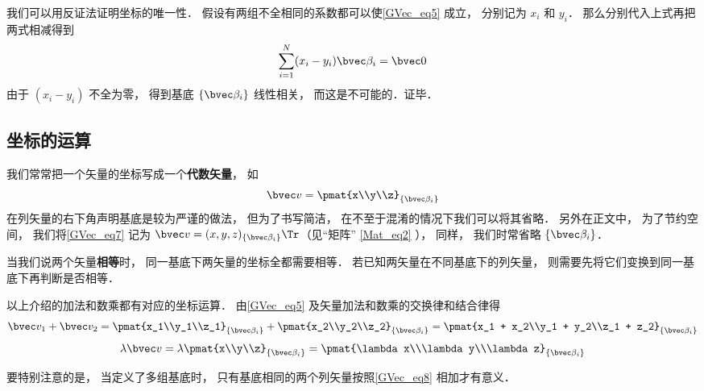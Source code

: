 我们可以用反证法证明坐标的唯一性． 假设有两组不全相同的系数都可以使\autoref{GVec_eq5} 成立， 分别记为 $x_i$ 和 $y_i$． 那么分别代入上式再把两式相减得到
\begin{equation}
\sum_{i=1}^N (x_i-y_i) \bvec \beta_i = \bvec 0
\end{equation}
由于 $(x_i-y_i)$ 不全为零， 得到基底 $\{\bvec \beta_i\}$ 线性相关， 而这是不可能的．证毕．

\subsection{坐标的运算}
我们常常把一个矢量的坐标写成一个\textbf{代数矢量}， 如
\begin{equation}\label{GVec_eq7}
\bvec v = \pmat{x\\y\\z}_{\{\bvec\beta_i\}}
\end{equation}
在列矢量的右下角声明基底是较为严谨的做法， 但为了书写简洁， 在不至于混淆的情况下我们可以将其省略． 另外在正文中， 为了节约空间， 我们将\autoref{GVec_eq7} 记为 $\bvec v = (x, y, z)_{\{\bvec\beta_i\}}\Tr$（见“矩阵” \autoref{Mat_eq2} ）， 同样， 我们时常省略 $\{\bvec\beta_i\}$．

当我们说两个矢量\textbf{相等}时， 同一基底下两矢量的坐标全都需要相等． 若已知两矢量在不同基底下的列矢量， 则需要先将它们变换到同一基底下再判断是否相等．

以上介绍的加法和数乘都有对应的坐标运算． 由\autoref{GVec_eq5} 及矢量加法和数乘的交换律和结合律得
\begin{equation}\label{GVec_eq8}
\bvec v_1 + \bvec v_2 = \pmat{x_1\\y_1\\z_1}_{\{\bvec\beta_i\}} + \pmat{x_2\\y_2\\z_2}_{\{\bvec\beta_i\}} = \pmat{x_1 + x_2\\y_1 + y_2\\z_1 + z_2}_{\{\bvec\beta_i\}}
\end{equation}
\begin{equation}\label{GVec_eq9}
\lambda \bvec v = \lambda\pmat{x\\y\\z}_{\{\bvec\beta_i\}} = \pmat{\lambda x\\\lambda y\\\lambda z}_{\{\bvec\beta_i\}}
\end{equation}

要特别注意的是， 当定义了多组基底时， 只有基底相同的两个列矢量按照\autoref{GVec_eq8} 相加才有意义．

